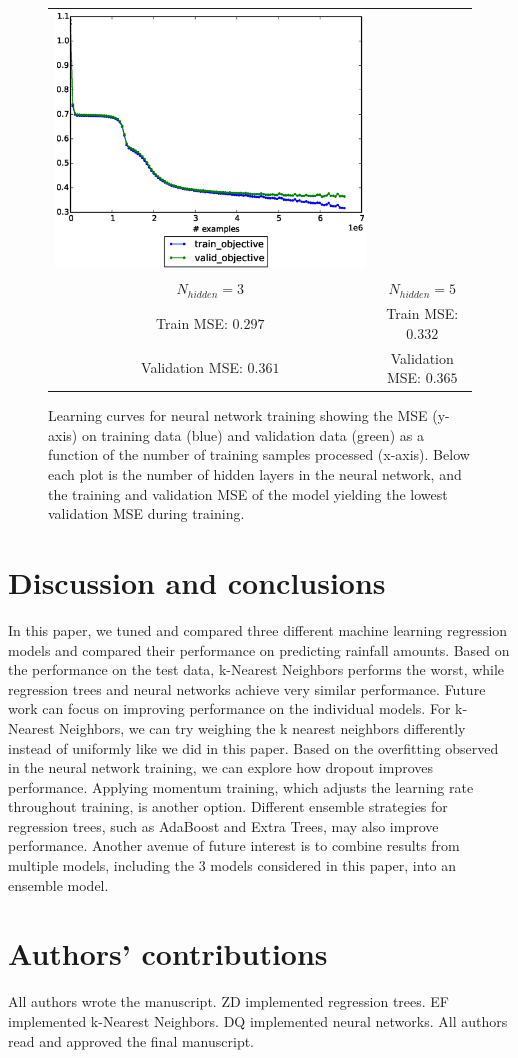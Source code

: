 \documentclass[12pt] {article}
\renewcommand{\baselinestretch}{1.1} %
\begin{document}
\begin{figure}[h!]
\begin{tabular}{cc}
\includegraphics[trim = 0mm 20mm 0mm 10mm, clip=true, width=.45\textwidth]{figdir/nn_mse_5.eps} \\
$N_{hidden}=3$ & $N_{hidden}=5$ \\
Train MSE: $0.297$ & Train MSE: $0.332$ \\
Validation MSE: $0.361$ & Validation MSE: $0.365$ \\
\end{tabular}
\caption{Learning curves for neural network training showing the MSE (y-axis) on training data (blue) and validation data (green) as a function of the number of training samples processed (x-axis). Below each plot is the number of hidden layers in the neural network, and the training and validation MSE of the model yielding the lowest validation MSE during training.}
\end{figure}
\renewcommand{\baselinestretch}{1.1} %

\section{Discussion and conclusions}
In this paper, we tuned and compared three different machine learning regression models and compared their performance on predicting rainfall amounts. Based on the performance on the test data, k-Nearest Neighbors performs the worst, while regression trees and neural networks achieve very similar performance. Future work can focus on improving performance on the individual models. For k-Nearest Neighbors, we can try weighing the k nearest neighbors differently instead of uniformly like we did in this paper. Based on the overfitting observed in the neural network training, we can explore how dropout improves performance. Applying momentum training, which adjusts the learning rate throughout training, is another option. Different ensemble strategies for regression trees, such as AdaBoost and Extra Trees, may also improve performance. Another avenue of future interest is to combine results from multiple models, including the 3 models considered in this paper, into an ensemble model.

\section{Authors' contributions}
All authors wrote the manuscript. ZD implemented regression trees. EF implemented k-Nearest Neighbors. DQ implemented neural networks. All authors read and approved the final manuscript.
\end{document}
